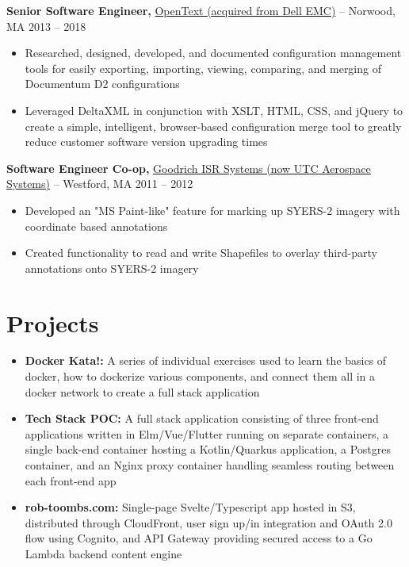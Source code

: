 \documentclass[10pt,letterpaper]{article}
\begin{document}
\textbf{Senior Software Engineer,} \href{https://www.fstl1992.com/}{OpenText (acquired from Dell EMC)} -- Norwood, MA \hfill 2013 -- 2018 \\
\vspace{-9pt}
\begin{itemize}
  \item Researched, designed, developed, and documented configuration management tools for easily exporting, importing, viewing, comparing, and merging of Documentum D2 configurations
  \item Leveraged DeltaXML in conjunction with XSLT, HTML, CSS, and jQuery to create a simple, intelligent, browser-based configuration merge tool to greatly reduce customer software version upgrading times
\end{itemize}

\textbf{Software Engineer Co-op,} \href{https://www.fstl1992.com/}{Goodrich ISR Systems (now UTC Aerospace Systems)} -- Westford, MA \hfill 2011 -- 2012 \\
\vspace{-9pt}
\begin{itemize}
  \item Developed an "MS Paint-like" feature for marking up SYERS-2 imagery with coordinate based annotations
  \item Created functionality to read and write Shapefiles to overlay third-party annotations onto SYERS-2 imagery
\end{itemize}

\vspace{-18.5pt}


 \section*{Projects}
 \begin{itemize}
   \item \textbf{Docker Kata!:} A series of individual exercises used to learn the basics of docker, how to dockerize various components, and connect them all in a docker network to create a full stack application
   \item \textbf{Tech Stack POC:} A full stack application consisting of three front-end applications written in Elm/Vue/Flutter running on separate containers, a single back-end container hosting a Kotlin/Quarkus application, a Postgres container, and an Nginx proxy container handling seamless routing between each front-end app
   \item \textbf{rob-toombs.com:} Single-page Svelte/Typescript app hosted in S3, distributed through CloudFront, user sign up/in integration and OAuth 2.0 flow using Cognito, and API Gateway providing secured access to a Go Lambda backend content engine
 \end{itemize}
\end{document}
